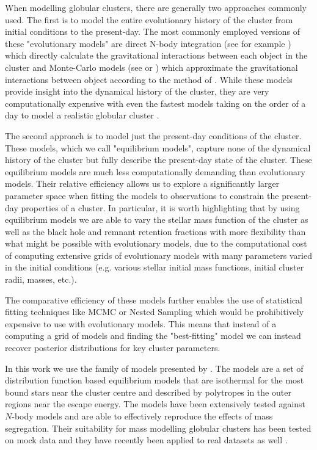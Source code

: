 When modelling globular clusters, there are generally two approaches commonly used. The first is to
model the entire evolutionary history of the cluster from initial conditions to the present-day. The
most commonly employed versions of these "evolutionary models" are direct N-body integration (see
for example \citet{Baumgardt2017a}) which directly calculate the gravitational interactions between
each object in the cluster and Monte-Carlo models (see \citet{Rodriguez2021} or \cite{Hypki2013})
which approximate the gravitational interactions between object according to the method of
\citet{Henon1971}. While these models provide insight into the dynamical history of the cluster,
they are very computationally expensive with even the fastest models taking on the order of a day to
model a realistic globular cluster \citep{Rodriguez2021}.

The second approach is to model just the present-day conditions of the cluster. These models, which
we call "equilibrium models", capture none of the dynamical history of the cluster but fully
describe the present-day state of the cluster. These equilibrium models are much less
computationally demanding than evolutionary models. Their relative efficiency allows us to explore a
significantly larger parameter space when fitting the models to observations to constrain the
present-day properties of a cluster. In particular, it is worth highlighting that by using
equilibrium models we are able to vary the stellar mass function of the cluster as well as the black
hole and remnant retention fractions with more flexibility than what might be possible with
evolutionary models, due to the computational cost of computing extensive grids of evolutionary
models with many parameters varied in the initial conditions (e.g. various stellar initial mass
functions, initial cluster radii, masses, etc.).

The comparative efficiency of these models further enables the use of statistical fitting techniques
like MCMC or Nested Sampling which would be prohibitively expensive to use with evolutionary models.
This means that instead of a computing a grid of models and finding the "best-fitting" model we can
instead recover posterior distributions for key cluster parameters.


In this work we use the  family of models presented by \citet{Gieles2015}. The
 models are a set of distribution function based equilibrium models that are isothermal
for the most bound stars near the cluster centre and described by polytropes in the outer regions
near the escape energy. The models have been extensively tested against $N$-body models
\citep{Zocchi2016, Peuten2017} and are able to effectively reproduce the effects of mass
segregation. Their suitability for mass modelling globular clusters has been tested on mock data
\citep{Henault-Brunet2019} and they have recently been applied to real datasets as well
\citep[e.g.][]{Gieles2018, Henault-Brunet2020}.

